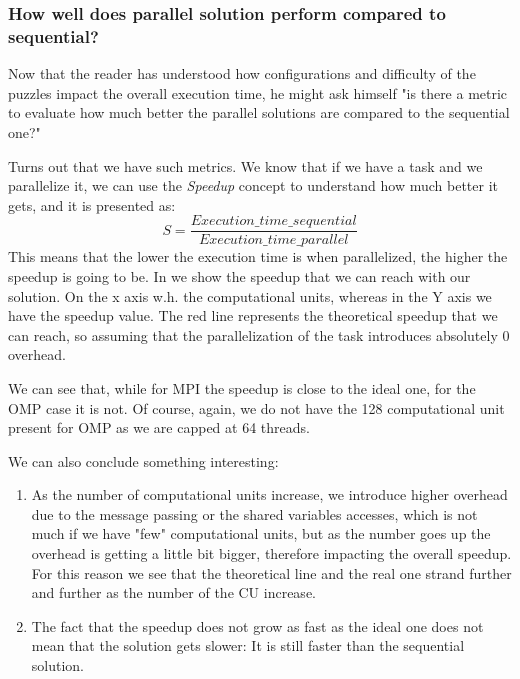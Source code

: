 \subsubsection{How well does parallel solution perform compared to sequential?}
\label{subsubsec:speedup_efficiency}

Now that the reader has understood how configurations and difficulty of the puzzles impact the overall execution time, he might ask himself "is there a metric to evaluate how much better the parallel solutions are compared to the sequential one?"

Turns out that we have such metrics. We know that if we have a task and we parallelize it, we can use the \textit{Speedup} concept to understand how much better it gets, and it is presented as:
\[
S = \frac{Execution\_time\_sequential}{Execution\_time\_parallel}
\]
This means that the lower the execution time is when parallelized, the higher the speedup is going to be. In  we show the speedup that we can reach with our solution. On the x axis w.h. the computational units, whereas in the Y axis we have the speedup value. The red line represents the theoretical speedup that we can reach, so assuming that the parallelization of the task introduces absolutely 0 overhead.


We can see that, while for MPI the speedup is close to the ideal one, for the OMP case it is not. Of course, again, we do not have the 128 computational unit present for OMP as we are capped at 64 threads.

We can also conclude something interesting:
\begin{enumerate}
    \item As the number of computational units increase, we introduce higher overhead due to the message passing or the shared variables accesses, which is not much if we have "few" computational units, but as the number goes up the overhead is getting a little bit bigger, therefore impacting the overall speedup. For this reason we see that the theoretical line and the real one strand further and further as the number of the CU increase.
    \item The fact that the speedup does not grow as fast as the ideal one does not mean that the solution gets slower: It is still faster than the sequential solution.
\end{enumerate}



